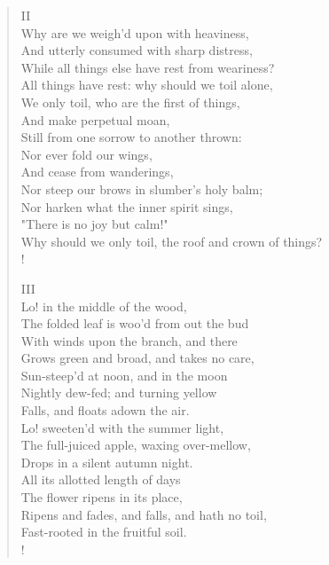 \documentclass[10pt]{memoir}
\begin{document}
\begin{verse}
II\\
Why are we weigh'd upon with heaviness,\\
And utterly consumed with sharp distress,\\
While all things else have rest from weariness?\\
All things have rest: why should we toil alone,\\
We only toil, who are the first of things,\\
And make perpetual moan,\\
Still from one sorrow to another thrown:\\
Nor ever fold our wings,\\
And cease from wanderings,\\
Nor steep our brows in slumber's holy balm;\\
Nor harken what the inner spirit sings,\\
"There is no joy but calm!"\\
Why should we only toil, the roof and crown of things?\\!

III\\
Lo! in the middle of the wood,\\
The folded leaf is woo'd from out the bud\\
With winds upon the branch, and there\\
Grows green and broad, and takes no care,\\
Sun-steep'd at noon, and in the moon\\
Nightly dew-fed; and turning yellow\\
Falls, and floats adown the air.\\
Lo! sweeten'd with the summer light,\\
The full-juiced apple, waxing over-mellow,\\
Drops in a silent autumn night.\\
All its allotted length of days\\
The flower ripens in its place,\\
Ripens and fades, and falls, and hath no toil,\\
Fast-rooted in the fruitful soil.\\!


\end{verse}
\end{document}
